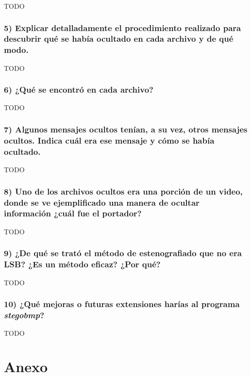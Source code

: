 \documentclass[a4paper,10pt]{article}
\begin{document}
TODO

\subsubsection*{ 5) Explicar detalladamente el procedimiento realizado para descubrir qué se había ocultado en
cada archivo y de qué modo.}

TODO

\subsubsection*{ 6) ¿Qué se encontró en cada archivo?}

TODO

\subsubsection*{ 7) Algunos mensajes ocultos tenían, a su vez, otros mensajes ocultos. Indica cuál era ese mensaje
y cómo se había ocultado.}

TODO

\subsubsection*{ 8) Uno de los archivos ocultos era una porción de un video, donde se ve ejemplificado una manera
de ocultar información ¿cuál fue el portador?}

TODO

\subsubsection*{ 9) ¿De qué se trató el método de estenografiado que no era LSB? ¿Es un método eficaz? ¿Por qué?}

TODO

\subsubsection*{ 10) ¿Qué mejoras o futuras extensiones harías al programa \textit{stegobmp}?}

TODO

\clearpage
\appendix
\section{Anexo}
\end{document}
